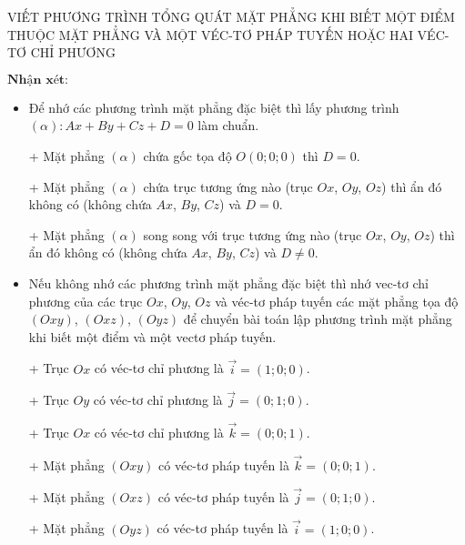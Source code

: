 \begin{dang}{VIẾT PHƯƠNG TRÌNH TỔNG QUÁT MẶT PHẲNG KHI BIẾT MỘT ĐIỂM THUỘC MẶT PHẲNG VÀ MỘT VÉC-TƠ PHÁP TUYẾN HOẶC HAI VÉC-TƠ CHỈ PHƯƠNG}
\begin{enumerate}[a.]
\end{enumerate}
$\textbf{Nhận xét:}$
\begin{itemize}
\item Để nhớ các phương trình mặt phẳng đặc biệt thì lấy phương trình $\left(\alpha\right) \colon Ax+By+Cz+D=0$  làm chuẩn.
\item[+] Mặt phẳng $\left(\alpha\right)$ chứa gốc tọa độ $O\left(0;0;0\right)$ thì $D=0$.
\item[+] Mặt phẳng $\left(\alpha\right)$ chứa trục tương ứng nào (trục $Ox$, $Oy$, $Oz$) thì ẩn đó không có (không chứa $Ax$, $By$, $Cz$) và $D=0$.
\item[+] Mặt phẳng $\left(\alpha\right)$ song song với trục tương ứng nào (trục $Ox$, $Oy$, $Oz$) thì ẩn đó không có (không chứa $Ax$, $By$, $Cz$) và $D \neq 0$.
\item Nếu không nhớ các phương trình mặt phẳng đặc biệt thì nhớ vec-tơ chỉ phương của các trục $Ox$, $Oy$, $Oz$ và véc-tơ pháp tuyến các mặt phẳng tọa độ $\left(Oxy\right)$, $\left(Oxz\right)$, $\left(Oyz\right)$ để chuyển bài toán lập phương trình mặt phẳng khi biết một điểm và một vectơ pháp tuyến.
\item[+] Trục $Ox$ có véc-tơ chỉ phương là $\overrightarrow{i} = \left(1;0;0\right)$.
\item[+] Trục $Oy$ có véc-tơ chỉ phương là $\overrightarrow{j} = \left(0;1;0\right)$.
\item[+] Trục $Ox$ có véc-tơ chỉ phương là $\overrightarrow{k} = \left(0;0;1\right)$.
\item[+] Mặt phẳng $\left(Oxy\right)$ có véc-tơ pháp tuyến là $\overrightarrow{k} = \left(0;0;1\right)$.
\item[+] Mặt phẳng $\left(Oxz\right)$ có véc-tơ pháp tuyến là $\overrightarrow{j} = \left(0;1;0\right)$.
\item[+] Mặt phẳng $\left(Oyz\right)$ có véc-tơ pháp tuyến là $\overrightarrow{i} = \left(1;0;0\right)$.
\end{itemize}
\end{dang}


